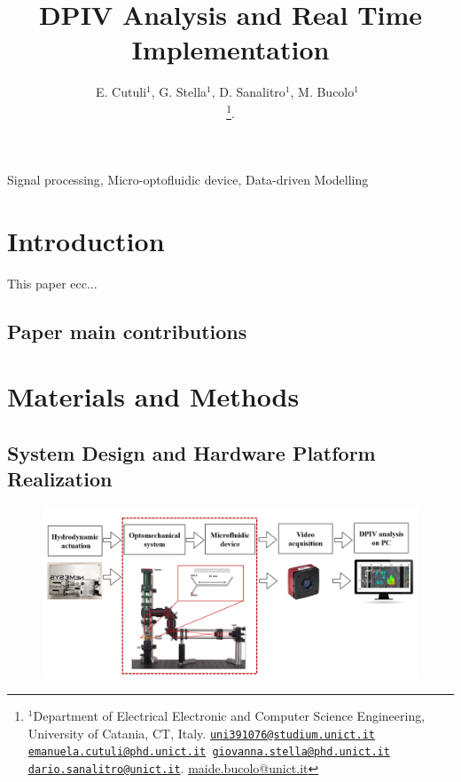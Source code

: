 \documentclass[journal]{IEEEtran}
\title{DPIV Analysis and Real Time Implementation}
\author{E. Cutuli${^{1}}$, G. Stella${^{1}}$, D. Sanalitro${^{1}}$, M. Bucolo${^{1}}$~\IEEEmembership{Senior Member,~IEEE}

\thanks{$^1$Department of Electrical Electronic and Computer Science Engineering, University of Catania, CT, Italy. {\tt \scriptsize\href{mailto:uni391076@studium.unict.it}{\mbox{uni391076@studium.unict.it}}
\scriptsize\href{mailto:emaunuela.cutuli@phd.unict.it}{\mbox{emanuela.cutuli@phd.unict.it}}
\scriptsize\href{mailto:giovanna.stella@phd.unict.it}{\mbox{giovanna.stella@phd.unict.it}}
\scriptsize\href{mailto:dario.sanalitro@unict.it}{\mbox{dario.sanalitro@unict.it}}}. 
\scriptsize\href{mailto:maide.bucolo@unict.it}{\mbox{maide.bucolo@unict.it}}}. 
}
\theoremstyle{definition}
\theoremstyle{remark}
\begin{document}


\maketitle

\begin{abstract}

\end{abstract}

\begin{IEEEkeywords}
	Signal processing, Micro-optofluidic device, Data-driven Modelling
\end{IEEEkeywords}

\section{Introduction}

This paper ecc...

\subsection{Paper main contributions}


\section{Materials and Methods}

\subsection{System Design and Hardware Platform Realization}\label{sec:design}

\begin{figure}[!h]
	\centering
	\includegraphics[width=1\columnwidth]{images/PlatformDesign}
\end{figure}
\end{document}
